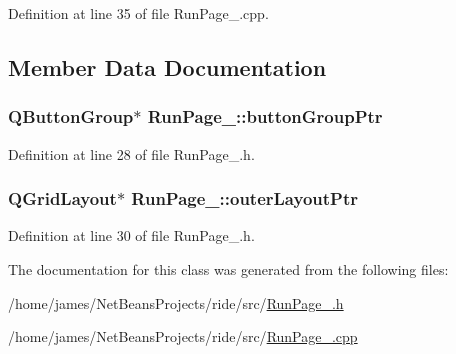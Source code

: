Definition at line 35 of file Run\-Page\-\_.\-cpp.



\subsection{Member Data Documentation}
\hypertarget{class_run_page__1_a951be96108a118e057257ae1ea6a7b88}{
\subsubsection[{button\-Group\-Ptr}]{\setlength{\rightskip}{0pt plus 5cm}Q\-Button\-Group$\ast$ Run\-Page\-\_\-::button\-Group\-Ptr\hspace{0.3cm}{\ttfamily [private]}}}\label{class_run_page__1_a951be96108a118e057257ae1ea6a7b88}


Definition at line 28 of file Run\-Page\-\_.\-h.

\hypertarget{class_run_page__1_a28dd1443caf175454399a1f47c719a2a}{
\subsubsection[{outer\-Layout\-Ptr}]{\setlength{\rightskip}{0pt plus 5cm}Q\-Grid\-Layout$\ast$ Run\-Page\-\_\-::outer\-Layout\-Ptr\hspace{0.3cm}{\ttfamily [private]}}}\label{class_run_page__1_a28dd1443caf175454399a1f47c719a2a}


Definition at line 30 of file Run\-Page\-\_.\-h.



The documentation for this class was generated from the following files\-:\begin{DoxyCompactItemize}
\item 
/home/james/\-Net\-Beans\-Projects/ride/src/\hyperlink{_run_page__1_8h}{Run\-Page\-\_.\-h}\item 
/home/james/\-Net\-Beans\-Projects/ride/src/\hyperlink{_run_page__1_8cpp}{Run\-Page\-\_.\-cpp}\end{DoxyCompactItemize}
